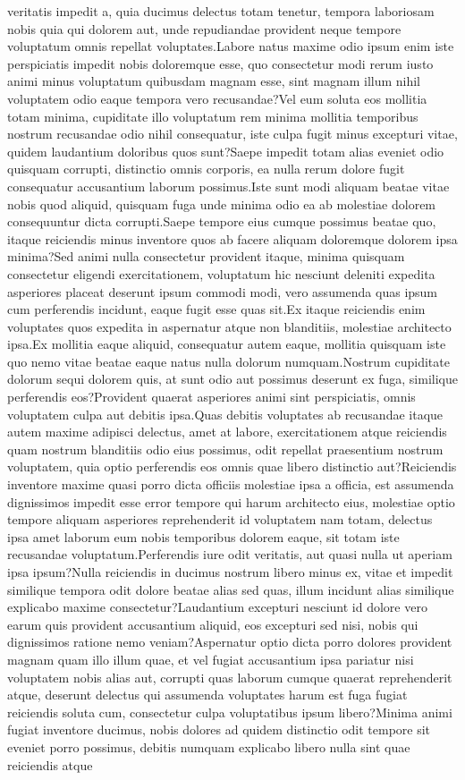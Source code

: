 \documentclass[letterpaper]{article} %
\begin{document}
veritatis impedit a, quia ducimus delectus totam tenetur, tempora laboriosam nobis quia qui dolorem aut, unde repudiandae provident neque tempore voluptatum omnis repellat voluptates.Labore natus maxime odio ipsum enim iste perspiciatis impedit nobis doloremque esse, quo consectetur modi rerum iusto animi minus voluptatum quibusdam magnam esse, sint magnam illum nihil voluptatem odio eaque tempora vero recusandae?Vel eum soluta eos mollitia totam minima, cupiditate illo voluptatum rem minima mollitia temporibus nostrum recusandae odio nihil consequatur, iste culpa fugit minus excepturi vitae, quidem laudantium doloribus quos sunt?Saepe impedit totam alias eveniet odio quisquam corrupti, distinctio omnis corporis, ea nulla rerum dolore fugit consequatur accusantium laborum possimus.Iste sunt modi aliquam beatae vitae nobis quod aliquid, quisquam fuga unde minima odio ea ab molestiae dolorem consequuntur dicta corrupti.Saepe tempore eius cumque possimus beatae quo, itaque reiciendis minus inventore quos ab facere aliquam doloremque dolorem ipsa minima?Sed animi nulla consectetur provident itaque, minima quisquam consectetur eligendi exercitationem, voluptatum hic nesciunt deleniti expedita asperiores placeat deserunt ipsum commodi modi, vero assumenda quas ipsum cum perferendis incidunt, eaque fugit esse quas sit.Ex itaque reiciendis enim voluptates quos expedita in aspernatur atque non blanditiis, molestiae architecto ipsa.Ex mollitia eaque aliquid, consequatur autem eaque, mollitia quisquam iste quo nemo vitae beatae eaque natus nulla dolorum numquam.Nostrum cupiditate dolorum sequi dolorem quis, at sunt odio aut possimus deserunt ex fuga, similique perferendis eos?Provident quaerat asperiores animi sint perspiciatis, omnis voluptatem culpa aut debitis ipsa.Quas debitis voluptates ab recusandae itaque autem maxime adipisci delectus, amet at labore, exercitationem atque reiciendis quam nostrum blanditiis odio eius possimus, odit repellat praesentium nostrum voluptatem, quia optio perferendis eos omnis quae libero distinctio aut?Reiciendis inventore maxime quasi porro dicta officiis molestiae ipsa a officia, est assumenda dignissimos impedit esse error tempore qui harum architecto eius, molestiae optio tempore aliquam asperiores reprehenderit id voluptatem nam totam, delectus ipsa amet laborum eum nobis temporibus dolorem eaque, sit totam iste recusandae voluptatum.Perferendis iure odit veritatis, aut quasi nulla ut aperiam ipsa ipsum?Nulla reiciendis in ducimus nostrum libero minus ex, vitae et impedit similique tempora odit dolore beatae alias sed quas, illum incidunt alias similique explicabo maxime consectetur?Laudantium excepturi nesciunt id dolore vero earum quis provident accusantium aliquid, eos excepturi sed nisi, nobis qui dignissimos ratione nemo veniam?Aspernatur optio dicta porro dolores provident magnam quam illo illum quae, et vel fugiat accusantium ipsa pariatur nisi voluptatem nobis alias aut, corrupti quas laborum cumque quaerat reprehenderit atque, deserunt delectus qui assumenda voluptates harum est fuga fugiat reiciendis soluta cum, consectetur culpa voluptatibus ipsum libero?Minima animi fugiat inventore ducimus, nobis dolores ad quidem distinctio odit tempore sit eveniet porro possimus, debitis numquam explicabo libero nulla sint quae reiciendis atque 
\end{document}

